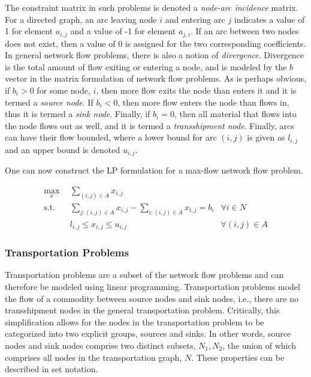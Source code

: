 The constraint matrix in such problems is denoted a \textit{node-arc incidence}
matrix. For a directed graph, an arc leaving node $i$ and entering arc $j$
indicates a value of 1 for element $a_{i,j}$ and a value of -1 for element
$a_{j,i}$. If an arc between two nodes does not exist, then a value of 0 is
assigned for the two corresponding coefficients. In general network flow
problems, there is also a notion of \textit{divergence}. Divergence is the total
amount of flow exiting or entering a node, and is modeled by the $b$ vector in
the matrix formulation of network flow problems. As is perhaps obvious, if $b_i
> 0$ for some node, $i$, then more flow exits the node than enters it and it is
termed a \textit{source node}. If $b_i < 0$, then more flow enters the node than
flows in, thus it is termed a \textit{sink node}. Finally, if $b_i = 0$, then
all material that flows into the node flows out as well, and it is termed a
\textit{transshipment node}. Finally, arcs can have their flow bounded, where a
lower bound for arc $(i, j)$ is given as $l_{i,j}$ and an upper bound is denoted
$u_{i,j}$.

One can now construct the LP formulation for a max-flow network flow problem.

\begin{subequations}\label{eqs:max-flow}
  \begin{align}
    \max_{x} \:\: & 
    \sum_{(i, j) \in A} x_{i,j}
    & \label{eqs:max-flow_obj} \\
    \text{s.t.} \:\: &
    \sum_{j:(i,j) \in A} x_{i,j} - \sum_{i:(i,j) \in A} x_{i,j} = b_i
    & \forall i \in N \label{eqs:max-flow_sup} \\
    &
    l_{i,j} \leq x_{i,j} \leq u_{i,j}
    & \forall (i, j) \in A \label{eqs:max-flow_x}
  \end{align}
\end{subequations}

\subsubsection{Transportation Problems}
Transportation problems are a subset of the network flow problems and can
therefore be modeled using linear programming. Transportation problems model the
flow of a commodity between source nodes and sink nodes, i.e., there are no
transshipment nodes in the general transportation problem. Critically, this
simplification allows for the nodes in the transportation problem to be
categorized into two explicit groups, sources and sinks. In other words, source
nodes and sink nodes comprise two distinct subsets, $N_1, N_2$, the union of
which comprises all nodes in the transportation graph, $N$. These properties can
be described in set notation.


